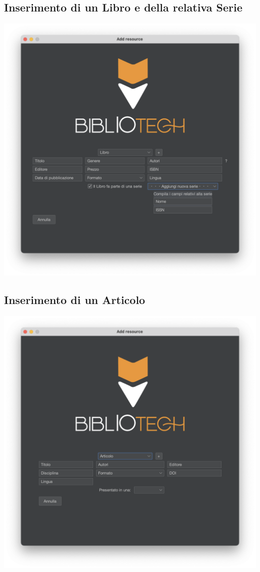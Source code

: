 \subsection{Inserimento di un Libro e della relativa Serie}
\includegraphics[scale=0.45]{Immagini/Schermate/Insert/InserisciRisorsaPage-LibroSerie.png}

\subsection{Inserimento di un Articolo}
\includegraphics[scale=0.45]{Immagini/Schermate/Insert/InserisciRisorsaPage-Articolo.png}
